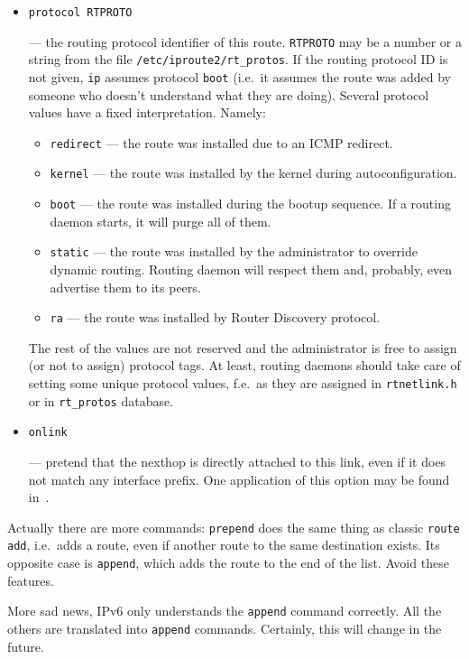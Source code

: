 \begin{itemize}
\item \verb|protocol RTPROTO|

--- the routing protocol identifier of this route.
\verb|RTPROTO| may be a number or a string from the file
\verb|/etc/iproute2/rt_protos|. If the routing protocol ID is
not given, \verb|ip| assumes protocol \verb|boot| (i.e.\
it assumes the route was added by someone who doesn't
understand what they are doing). Several protocol values have a fixed interpretation.
Namely:
\begin{itemize}
\item \verb|redirect| --- the route was installed due to an ICMP redirect.
\item \verb|kernel| --- the route was installed by the kernel during
autoconfiguration.
\item \verb|boot| --- the route was installed during the bootup sequence.
If a routing daemon starts, it will purge all of them.
\item \verb|static| --- the route was installed by the administrator
to override dynamic routing. Routing daemon will respect them
and, probably, even advertise them to its peers.
\item \verb|ra| --- the route was installed by Router Discovery protocol.
\end{itemize}
The rest of the values are not reserved and the administrator is free
to assign (or not to assign) protocol tags. At least, routing
daemons should take care of setting some unique protocol values,
f.e.\ as they are assigned in \verb|rtnetlink.h| or in \verb|rt_protos|
database.


\item \verb|onlink|

--- pretend that the nexthop is directly attached to this link,
even if it does not match any interface prefix. One application of this
option may be found in~\cite{IP-TUNNELS}.

\end{itemize}


\begin{NB}
  Actually there are more commands: \verb|prepend| does the same
  thing as classic \verb|route add|, i.e.\ adds a route, even if another
  route to the same destination exists. Its opposite case is \verb|append|,
  which adds the route to the end of the list. Avoid these
  features.
\end{NB}
\begin{NB}
  More sad news, IPv6 only understands the \verb|append| command correctly.
  All the others are translated into \verb|append| commands. Certainly,
  this will change in the future.
\end{NB}

